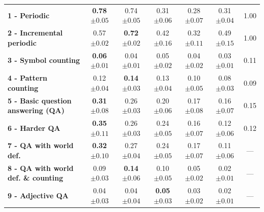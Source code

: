 {\begin{table}[htbp]
\begin{tabular}{lcc|ccc|c}
\bfseries 1 - Periodic & \bfseries 0.78 ${\scriptscriptstyle \pm0.05 }$ &  0.74 ${\scriptscriptstyle \pm0.05 }$ &  0.31 ${\scriptscriptstyle \pm0.06 }$ &  0.28 ${\scriptscriptstyle \pm0.07 }$  &  0.31 ${\scriptscriptstyle \pm0.04 }$& 1.00 \\
\bfseries 2 - Incremental periodic &  0.57 ${\scriptscriptstyle \pm0.02 }$ & \bfseries 0.72 ${\scriptscriptstyle \pm0.02 }$ &  0.42 ${\scriptscriptstyle \pm0.16 }$ &  0.32 ${\scriptscriptstyle \pm0.11 }$  &  0.49 ${\scriptscriptstyle \pm0.15 }$& 1.00 \\
\bfseries 3 - Symbol counting & \bfseries 0.06 ${\scriptscriptstyle \pm0.01 }$ &  0.04 ${\scriptscriptstyle \pm0.01 }$ &  0.05 ${\scriptscriptstyle \pm0.02 }$ &  0.04 ${\scriptscriptstyle \pm0.02 }$  &  0.03 ${\scriptscriptstyle \pm0.01 }$& 0.11 \\
\bfseries 4 - Pattern counting &  0.12 ${\scriptscriptstyle \pm0.04 }$ & \bfseries 0.14 ${\scriptscriptstyle \pm0.03 }$ &  0.13 ${\scriptscriptstyle \pm0.04 }$ &  0.10 ${\scriptscriptstyle \pm0.05 }$  &  0.08 ${\scriptscriptstyle \pm0.03 }$& 0.09 \\
\bfseries 5 - Basic question answering (QA) & \bfseries 0.31 ${\scriptscriptstyle \pm0.08 }$ &  0.26 ${\scriptscriptstyle \pm0.03 }$ &  0.20 ${\scriptscriptstyle \pm0.06 }$ &  0.17 ${\scriptscriptstyle \pm0.08 }$  &  0.16 ${\scriptscriptstyle \pm0.07 }$& 0.15 \\
\bfseries 6 - Harder QA & \bfseries 0.35 ${\scriptscriptstyle \pm0.11 }$ &  0.26 ${\scriptscriptstyle \pm0.03 }$ &  0.24 ${\scriptscriptstyle \pm0.05 }$ &  0.16 ${\scriptscriptstyle \pm0.07 }$  &  0.12 ${\scriptscriptstyle \pm0.06 }$& 0.12 \\
\bfseries 7 - QA with world def. & \bfseries 0.32 ${\scriptscriptstyle \pm0.10 }$ &  0.27 ${\scriptscriptstyle \pm0.04 }$ &  0.24 ${\scriptscriptstyle \pm0.05 }$ &  0.17 ${\scriptscriptstyle \pm0.07 }$  &  0.11 ${\scriptscriptstyle \pm0.06 }$& --- \\
\bfseries 8 - QA with world def. \& counting &  0.09 ${\scriptscriptstyle \pm0.03 }$ & \bfseries 0.14 ${\scriptscriptstyle \pm0.06 }$ &  0.10 ${\scriptscriptstyle \pm0.05 }$ &  0.05 ${\scriptscriptstyle \pm0.02 }$  &  0.02 ${\scriptscriptstyle \pm0.01 }$& --- \\
\bfseries 9 - Adjective QA &  0.04 ${\scriptscriptstyle \pm0.03 }$ &  0.04 ${\scriptscriptstyle \pm0.04 }$ & \bfseries 0.05 ${\scriptscriptstyle \pm0.03 }$ &  0.03 ${\scriptscriptstyle \pm0.02 }$  &  0.02 ${\scriptscriptstyle \pm0.01 }$& --- \\

\end{tabular}
\end{table}}

